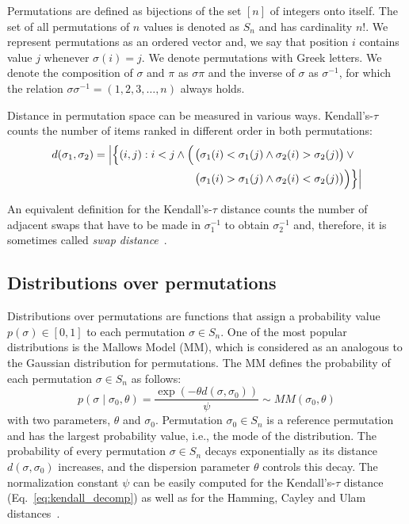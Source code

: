 \documentclass[runningheads]{llncs}
\newcommand{\Prob}{\ensuremath{p}}
\begin{document}
Permutations are defined as bijections of the set $[n]$ of integers onto itself. The set of all permutations of $n$ values is denoted as $S_n$ and has cardinality $n!$. We represent permutations as an ordered vector and, we say that position $i$ contains value $j$ whenever $\sigma(i)=j$. We denote permutations with Greek letters.
We denote the composition of $\sigma$ and $\pi$ as $\sigma\pi$ and the inverse of $\sigma$ as $\sigma^{-1}$, for which the relation $\sigma\sigma^{-1}=(1, 2, 3, \dotsc,n)$ always holds.


Distance in permutation space can be measured in various ways.  Kendall's-$\tau$ counts the number of items ranked in different order in both permutations:
%
\begin{equation}
\begin{split}
d(\sigma _{1},\sigma_{2})=\left\lvert\Bigl\{(i,j):i<j \land \phantom{}\Bigl(\right.&\bigl(\sigma_{1}(i) < \sigma_{1}(j)\land \sigma_{2}(i)>\sigma_{2}(j)\bigr)\lor \phantom{} \\
 &\bigl(\sigma_{1}(i)>\sigma_{1}(j)\land \sigma_{2}(i)<\sigma_{2}(j)\bigr)\Bigr)\Bigr\}\Bigr\rvert\\
 \end{split}
 \label{eq:kendall_decomp}
\end{equation}

An equivalent definition for the Kendall's-$\tau$ distance counts the number of adjacent swaps that have to be made in $\sigma_1^{-1}$ to obtain $\sigma_2^{-1}$ and, therefore, it is sometimes called \emph{swap distance}~\citep{ZaeStoBar2014:ppsn}.


\subsection{Distributions over permutations}
Distributions over permutations are functions that assign a probability value  $\Prob(\sigma)\in[0,1]$ to each permutation $\sigma \in S_n$. One of the most popular distributions is the Mallows Model (MM), which is considered as an analogous to the Gaussian distribution for permutations. The MM defines the probability of each permutation $\sigma\in S_n$ as follows:
%
\begin{equation}\label{eq:MM}
\Prob(\sigma \mid \sigma_0, \theta )= \frac{\exp(-\theta d(\sigma, \sigma_0))}{\psi} \sim MM(\sigma_0, \theta)
\end{equation}
%
with two parameters, $\theta$ and $\sigma_0$. Permutation $\sigma_0\in S_n$ is a reference permutation and has the largest probability value, i.e., the mode of the distribution. The probability of every permutation $\sigma\in S_n$ decays exponentially as its distance $d(\sigma,\sigma_0)$ increases, and the dispersion parameter $\theta$  controls this decay.  The normalization constant $\psi$ can be easily computed for the Kendall's-$\tau$ distance (Eq.~\eqref{eq:kendall_decomp}) as well as for the Hamming, Cayley and Ulam distances~\cite{IruCalLoz2016permallows}.
\end{document}
